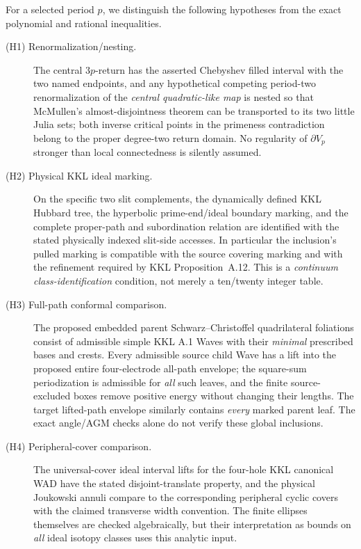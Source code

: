 \begin{definition}\label{def:bridges}
For a selected period $p$, we distinguish the following hypotheses
from the exact polynomial and rational inequalities.
\begin{description}
\item[(H1) Renormalization/nesting.]
The central $3p$-return has the asserted Chebyshev filled interval
with the two named endpoints, and any hypothetical competing
period-two renormalization of the \emph{central quadratic-like map}
is nested so that McMullen's almost-disjointness theorem can be
transported to its two little Julia sets; both inverse critical
points in the primeness contradiction belong to the proper
degree-two return domain.  No regularity of $\partial V_p$
stronger than local connectedness is silently assumed.

\item[(H2) Physical KKL ideal marking.]
On the specific two slit complements, the dynamically defined
KKL Hubbard tree, the hyperbolic prime-end/ideal boundary
marking, and the complete proper-path and subordination relation
are identified with the stated physically indexed slit-side
accesses.  In particular the inclusion's pulled marking
is compatible with the source covering marking and with
the refinement required by KKL Proposition~A.12.
This is a \emph{continuum class-identification} condition,
not merely a ten/twenty integer table.

\item[(H3) Full-path conformal comparison.]
The proposed embedded parent Schwarz--Christoffel
quadrilateral foliations consist of admissible simple
KKL A.1 Waves with their \emph{minimal} prescribed
bases and crests.  Every admissible source child Wave
has a lift into the proposed entire four-electrode
all-path envelope; the square-sum periodization is
admissible for \emph{all} such leaves, and the finite
source-excluded boxes remove positive energy without
changing their lengths.  The target lifted-path
envelope similarly contains \emph{every} marked parent
leaf.  The exact angle/AGM checks alone do not verify
these global inclusions.

\item[(H4) Peripheral-cover comparison.]
The universal-cover ideal interval lifts for the
four-hole KKL canonical WAD have the stated
disjoint-translate property, and the physical
Joukowski annuli compare to the corresponding
peripheral cyclic covers with the claimed transverse
width convention.  The finite ellipses themselves
are checked algebraically, but their interpretation
as bounds on \emph{all} ideal isotopy classes
uses this analytic input.
\end{description}
\end{definition}

